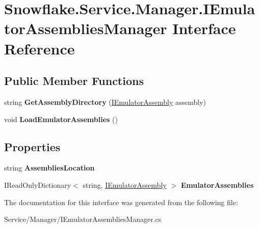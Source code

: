 \hypertarget{interface_snowflake_1_1_service_1_1_manager_1_1_i_emulator_assemblies_manager}{}\section{Snowflake.\+Service.\+Manager.\+I\+Emulator\+Assemblies\+Manager Interface Reference}
\label{interface_snowflake_1_1_service_1_1_manager_1_1_i_emulator_assemblies_manager}
\subsection*{Public Member Functions}
\begin{DoxyCompactItemize}
\item 
\hypertarget{interface_snowflake_1_1_service_1_1_manager_1_1_i_emulator_assemblies_manager_a0a146556db257e923418b0efd6d831c9}{}string {\bfseries Get\+Assembly\+Directory} (\hyperlink{interface_snowflake_1_1_emulator_1_1_i_emulator_assembly}{I\+Emulator\+Assembly} assembly)\label{interface_snowflake_1_1_service_1_1_manager_1_1_i_emulator_assemblies_manager_a0a146556db257e923418b0efd6d831c9}

\item 
\hypertarget{interface_snowflake_1_1_service_1_1_manager_1_1_i_emulator_assemblies_manager_a41335651d0254e6b70b87fbdb1befe95}{}void {\bfseries Load\+Emulator\+Assemblies} ()\label{interface_snowflake_1_1_service_1_1_manager_1_1_i_emulator_assemblies_manager_a41335651d0254e6b70b87fbdb1befe95}

\end{DoxyCompactItemize}
\subsection*{Properties}
\begin{DoxyCompactItemize}
\item 
\hypertarget{interface_snowflake_1_1_service_1_1_manager_1_1_i_emulator_assemblies_manager_a3d0a40222d54ccf84c1c3b36cba4b7cf}{}string {\bfseries Assemblies\+Location}\label{interface_snowflake_1_1_service_1_1_manager_1_1_i_emulator_assemblies_manager_a3d0a40222d54ccf84c1c3b36cba4b7cf}

\item 
\hypertarget{interface_snowflake_1_1_service_1_1_manager_1_1_i_emulator_assemblies_manager_abf0fa71659470094085c9b22efb00eff}{}I\+Read\+Only\+Dictionary$<$ string, \hyperlink{interface_snowflake_1_1_emulator_1_1_i_emulator_assembly}{I\+Emulator\+Assembly} $>$ {\bfseries Emulator\+Assemblies}\label{interface_snowflake_1_1_service_1_1_manager_1_1_i_emulator_assemblies_manager_abf0fa71659470094085c9b22efb00eff}

\end{DoxyCompactItemize}


The documentation for this interface was generated from the following file\+:\begin{DoxyCompactItemize}
\item 
Service/\+Manager/I\+Emulator\+Assemblies\+Manager.\+cs\end{DoxyCompactItemize}
